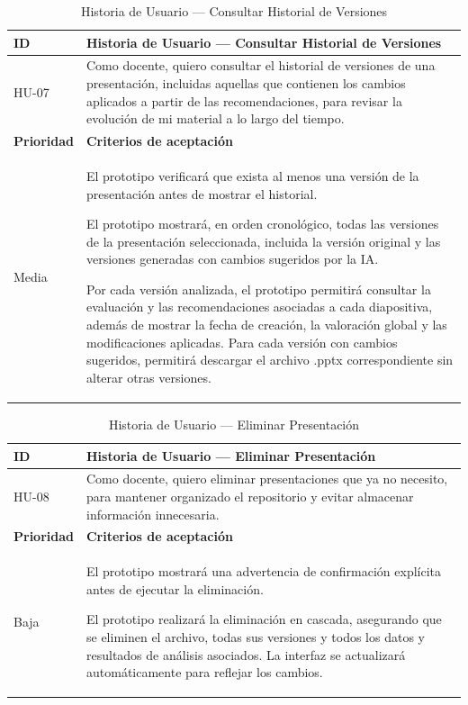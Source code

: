 \documentclass[11pt]{article}
\begin{document}
\begin{table}[H]
    \centering
    \renewcommand{\arraystretch}{1.2}
    \begin{tabular}{|p{2.5cm}|p{11cm}|}
        \hline
        \textbf{ID} & \textbf{Historia de Usuario --- Consultar Historial de Versiones} \\
        \hline
        HU-07 & Como docente, quiero consultar el historial de versiones de una presentación, incluidas aquellas que contienen los cambios aplicados a partir de las recomendaciones, para revisar la evolución de mi material a lo largo del tiempo. \\
        \hline
        \textbf{Prioridad} & \textbf{Criterios de aceptación} \\
        \hline
        Media & El prototipo verificará que exista al menos una versión de la presentación antes de mostrar el historial.
        
        El prototipo mostrará, en orden cronológico, todas las versiones de la presentación seleccionada, incluida la versión original y las versiones generadas con cambios sugeridos por la IA.
        
        Por cada versión analizada, el prototipo permitirá consultar la evaluación y las recomendaciones asociadas a cada diapositiva, además de mostrar la fecha de creación, la valoración global y las modificaciones aplicadas. Para cada versión con cambios sugeridos, permitirá descargar el archivo .pptx correspondiente sin alterar otras versiones. \\
        \hline
    \end{tabular}
    \caption{Historia de Usuario — Consultar Historial de Versiones}
    \label{tab:hu-historial-versiones}
\end{table}

\begin{table}[H]
    \centering
    \renewcommand{\arraystretch}{1.2}
    \begin{tabular}{|p{2.5cm}|p{11cm}|}
        \hline
        \textbf{ID} & \textbf{Historia de Usuario --- Eliminar Presentación} \\
        \hline
        HU-08 & Como docente, quiero eliminar presentaciones que ya no necesito, para mantener organizado el repositorio y evitar almacenar información innecesaria. \\
        \hline
        \textbf{Prioridad} & \textbf{Criterios de aceptación} \\
        \hline
        Baja & El prototipo mostrará una advertencia de confirmación explícita antes de ejecutar la eliminación. 
        
        El prototipo realizará la eliminación en cascada, asegurando que se eliminen el archivo, todas sus versiones y todos los datos y resultados de análisis asociados. La interfaz se actualizará automáticamente para reflejar los cambios. \\
        \hline
    \end{tabular}
    \caption{Historia de Usuario — Eliminar Presentación}
    \label{tab:hu-eliminar-presentacion}
\end{table}
\end{document}
